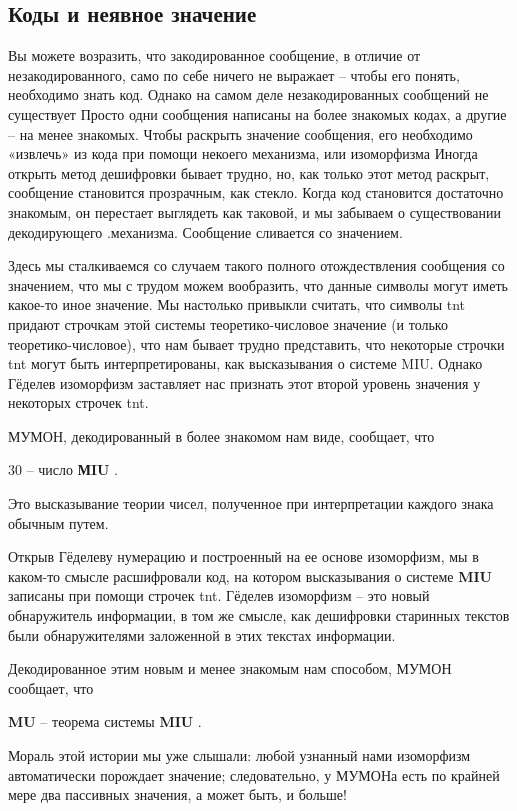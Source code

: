 \documentclass[../main.tex]{subfiles}
\begin{document}
\subsection{Коды и неявное значение}

Вы можете возразить, что закодированное сообщение, в отличие от незакодированного, само по себе ничего не выражает \--- чтобы его понять, необходимо знать код. Однако на самом деле незакодированных сообщений не существует Просто одни сообщения написаны на более знакомых кодах, а другие \--- на менее знакомых. Чтобы раскрыть значение сообщения, его необходимо «извлечь» из кода при помощи некоего механизма, или изоморфизма Иногда открыть метод дешифровки бывает трудно, но, как только этот метод раскрыт, сообщение становится прозрачным, как стекло. Когда код становится достаточно знакомым, он перестает выглядеть как таковой, и мы забываем о существовании декодирующего .механизма. Сообщение сливается со значением.

Здесь мы сталкиваемся со случаем такого полного отождествления сообщения со значением, что мы с трудом можем вообразить, что данные символы могут иметь какое-то иное значение. Мы настолько привыкли считать, что символы \acs{tnt} придают строчкам этой системы теоретико-числовое значение (и только теоретико-числовое), что нам бывает трудно представить, что некоторые строчки \acs{tnt} могут быть интерпретированы, как высказывания о системе MIU\@. Однако Гёделев изоморфизм заставляет нас признать этот второй уровень значения у некоторых строчек \acs{tnt}.

МУМОН, декодированный в более знакомом нам виде, сообщает, что

30 \--- число \textbf{МIU} .

Это высказывание теории чисел, полученное при интерпретации каждого знака обычным путем.

Открыв Гёделеву нумерацию и построенный на ее основе изоморфизм, мы в каком-то смысле расшифровали код, на котором высказывания о системе \textbf{MIU} записаны при помощи строчек \acs{tnt}\@. Гёделев изоморфизм \--- это новый обнаружитель информации, в том же смысле, как дешифровки старинных текстов были обнаружителями заложенной в этих текстах информации.

Декодированное этим новым и менее знакомым нам способом, МУМОН сообщает, что

\textbf{MU} \--- теорема системы \textbf{MIU} .

Мораль этой истории мы уже слышали: любой узнанный нами изоморфизм автоматически порождает значение; следовательно, у МУМОНа есть по крайней мере два пассивных значения, а может быть, и больше!
\end{document}
